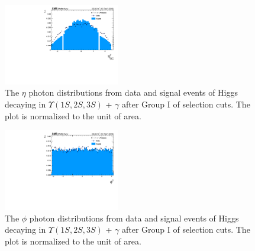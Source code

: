 \begin{figure}[!htbp]
\begin{center}
\includegraphics[width=0.45\textwidth]{figures_and_tables/outputPlots/HtoUpsilon_Cat0_ZZZZZ/au/data_x_mc/noKinCuts/h_noKin_Photon_eta}\hspace*{1.cm}
\end{center}\vspace*{-.5cm}
\caption{The $\eta$ photon distributions from data and signal events of Higgs decaying in $\Upsilon(1S,2S,3S)$ + $\gamma$ after Group I of selection cuts. The plot is normalized to the unit of area.}
\label{fig:etaPhoton_HtoUpsilon_Cat0}
\end{figure}

\begin{figure}[!htbp]
\begin{center}
\includegraphics[width=0.45\textwidth]{figures_and_tables/outputPlots/HtoUpsilon_Cat0_ZZZZZ/au/data_x_mc/noKinCuts/h_noKin_Photon_phi}\hspace*{1.cm}
\end{center}\vspace*{-.5cm}
\caption{The $\phi$ photon distributions from data and signal events of Higgs decaying in $\Upsilon(1S,2S,3S)$ + $\gamma$ after Group I of selection cuts. The plot is normalized to the unit of area.}
\label{fig:phiPhoton_HtoUpsilon_Cat0}
\end{figure}

